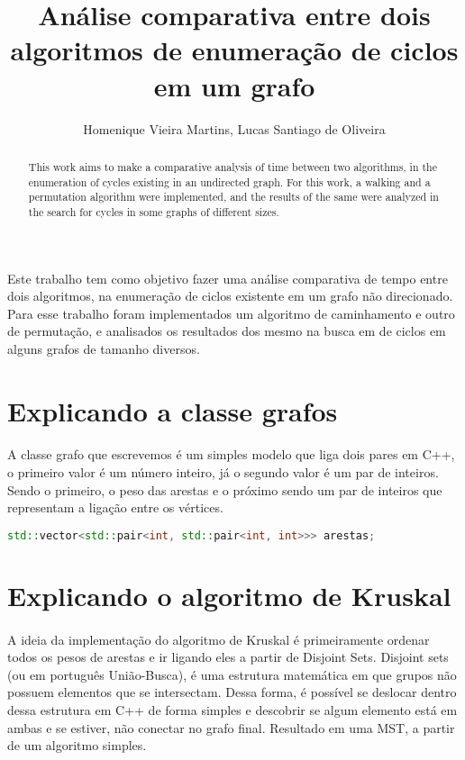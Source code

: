 \documentclass[12pt]{article}
\title{Análise comparativa entre dois algoritmos de enumeração de ciclos em um grafo}
\author{Homenique Vieira Martins, Lucas Santiago de Oliveira}
\begin{document}
 
    \maketitle

    \begin{abstract} 
        This work aims to make a comparative analysis of time between two algorithms,
        in the enumeration of cycles existing in an undirected graph. For this work, 
        a walking and a permutation algorithm were implemented, and the results of the
        same were analyzed in the search for cycles in some graphs of different sizes.
      \end{abstract}
    
      \begin{resumo} 
        Este trabalho tem como objetivo fazer uma análise comparativa de tempo entre dois algoritmos, 
        na enumeração de ciclos existente em um grafo não direcionado. Para esse trabalho foram implementados
        um algoritmo de caminhamento e outro de permutação, e analisados os resultados dos mesmo na busca em de 
        ciclos em alguns grafos de tamanho diversos.
      \end{resumo}
    
    \section{Explicando a classe grafos} \label{sec:graph}
      \paragraph{}A classe grafo que escrevemos é um simples modelo que liga dois pares em C++,
        o primeiro valor é um número inteiro, já o segundo valor é um par de inteiros. 
        Sendo o primeiro, o peso das arestas e o próximo sendo um par de inteiros que
        representam a ligação entre os vértices.

        \begin{lstlisting}[language=c++]
        std::vector<std::pair<int, std::pair<int, int>>> arestas;
        \end{lstlisting}


        \section{Explicando o algoritmo de Kruskal} \label{sec:Kruskal}
        \paragraph{} A ideia da implementação do algoritmo de Kruskal é primeiramente ordenar 
         todos os pesos de arestas e ir ligando eles a partir de Disjoint Sets. Disjoint sets 
         (ou em português União-Busca), é uma estrutura matemática em que grupos não possuem
         elementos que se intersectam. Dessa forma,
         é possível se deslocar dentro dessa estrutura em C++ de forma simples e descobrir se algum 
         elemento está em ambas e se estiver, não conectar no grafo final. Resultado em uma MST, 
         a partir de um algoritmo simples.
     
\end{document}
